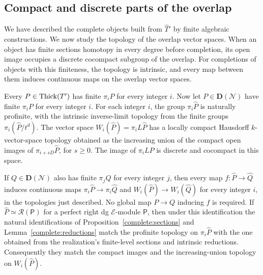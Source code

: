 \subsection{Compact and discrete parts of the overlap}

We have described the complete objects built from $\widehat T'$ by
finite algebraic constructions. We now study the topology of the overlap
vector spaces. When an object has finite sections homotopy in every degree
before completion, its open image occupies a discrete cocompact subgroup
of the overlap. For completions of objects with this finiteness, the
topology is intrinsic, and every map between them induces continuous
maps on the overlap vector spaces.

\begin{proposition}
\label{complete:topology}
Every $P\in\operatorname{Thick}(T')$ has finite $\pi_iP$ for every integer $i$.
Now let $P\in\mathbf D(\mathcal N)$ have finite $\pi_iP$ for every
integer $i$. For each integer $i$, the group $\pi_i\widehat P$ is
naturally profinite, with the intrinsic inverse-limit topology from the
finite groups $\pi_i(\widehat P/t^d)$. The vector space
$W_i(\widehat P)=\pi_iL\widehat P$ has a locally compact Hausdorff
$k$-vector-space topology obtained as the increasing union of the compact
open images of $\pi_{i+sD}\widehat P$, for $s\geq0$. The image of
$\pi_iLP$ is discrete and cocompact in this space.

If $Q\in\mathbf D(\mathcal N)$ also has finite $\pi_jQ$ for every
integer $j$, then every map $f:\widehat P\to\widehat Q$ induces
continuous maps $\pi_i\widehat P\to\pi_i\widehat Q$ and
$W_i(\widehat P)\to W_i(\widehat Q)$ for every integer $i$, in the
topologies just described. No global map $P\to Q$ inducing $f$ is
required. If $\widehat P\simeq\mathcal R(\mathsf P)$ for a perfect
right dg $\mathscr E$-module $\mathsf P$, then under this identification
the natural identifications of Proposition~\ref{complete:sections} and
Lemma~\ref{complete:reductions} match the profinite topology on
$\pi_i\widehat P$ with the one obtained from the realization's finite-level
sections and intrinsic reductions. Consequently they match the compact
images and the increasing-union topology on $W_i(\widehat P)$.
\end{proposition}

